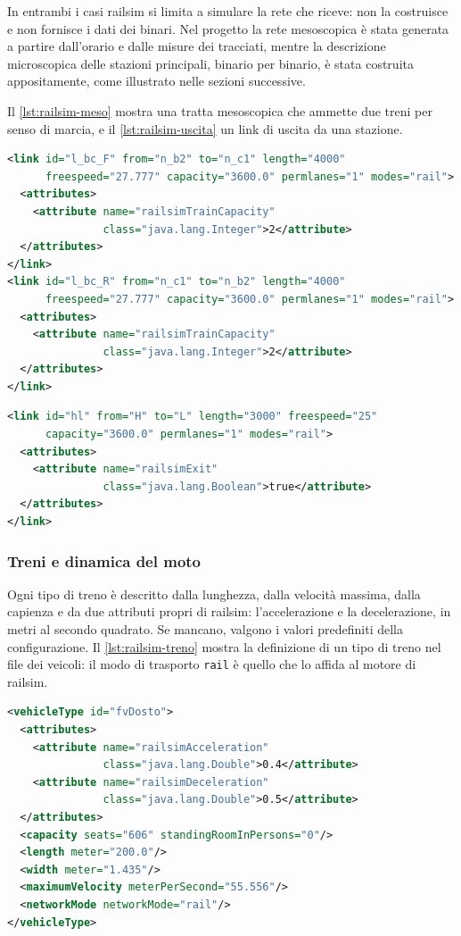 In entrambi i casi railsim si limita a simulare la rete che riceve: non la costruisce e non fornisce i dati dei binari. Nel progetto la rete mesoscopica è stata generata a partire dall'orario e dalle misure dei tracciati, mentre la descrizione microscopica delle stazioni principali, binario per binario, è stata costruita appositamente, come illustrato nelle sezioni successive.

Il \cref{lst:railsim-meso} mostra una tratta mesoscopica che ammette due treni per senso di marcia, e il \cref{lst:railsim-uscita} un link di uscita da una stazione.

\begin{lstlisting}[language=XML,caption={Tratta mesoscopica con capienza di due treni per senso.},label={lst:railsim-meso}]
<link id="l_bc_F" from="n_b2" to="n_c1" length="4000"
      freespeed="27.777" capacity="3600.0" permlanes="1" modes="rail">
  <attributes>
    <attribute name="railsimTrainCapacity"
               class="java.lang.Integer">2</attribute>
  </attributes>
</link>
<link id="l_bc_R" from="n_c1" to="n_b2" length="4000"
      freespeed="27.777" capacity="3600.0" permlanes="1" modes="rail">
  <attributes>
    <attribute name="railsimTrainCapacity"
               class="java.lang.Integer">2</attribute>
  </attributes>
</link>
\end{lstlisting}

\begin{lstlisting}[language=XML,caption={Link di uscita da una stazione.},label={lst:railsim-uscita}]
<link id="hl" from="H" to="L" length="3000" freespeed="25"
      capacity="3600.0" permlanes="1" modes="rail">
  <attributes>
    <attribute name="railsimExit"
               class="java.lang.Boolean">true</attribute>
  </attributes>
</link>
\end{lstlisting}

\subsubsection{Treni e dinamica del moto}
Ogni tipo di treno è descritto dalla lunghezza, dalla velocità massima, dalla capienza e da due attributi propri di railsim: l'accelerazione e la decelerazione, in metri al secondo quadrato. Se mancano, valgono i valori predefiniti della configurazione. 
Il \cref{lst:railsim-treno} mostra la definizione di un tipo di treno nel file dei veicoli: il modo di trasporto \texttt{rail} è quello che lo affida al motore di railsim.

\begin{lstlisting}[language=XML,caption={Definizione di un tipo di treno.},label={lst:railsim-treno}]
<vehicleType id="fvDosto">
  <attributes>
    <attribute name="railsimAcceleration"
               class="java.lang.Double">0.4</attribute>
    <attribute name="railsimDeceleration"
               class="java.lang.Double">0.5</attribute>
  </attributes>
  <capacity seats="606" standingRoomInPersons="0"/>
  <length meter="200.0"/>
  <width meter="1.435"/>
  <maximumVelocity meterPerSecond="55.556"/>
  <networkMode networkMode="rail"/>
</vehicleType>
\end{lstlisting}


